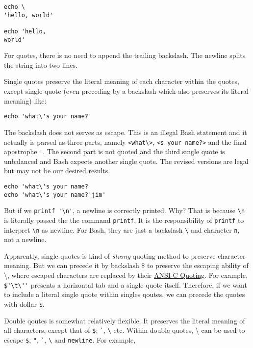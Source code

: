 \begin{lstlisting}
echo \
'hello, world'

echo 'hello,
world'
\end{lstlisting}

For quotes, there is no need to append the trailing backslash. The
newline splits the string into two lines.

Single quotes preserve the literal meaning of each character
within the quotes, except single quote (even preceding by a
backslash which also preserves its literal meaning) like:

\begin{lstlisting}
echo 'what\'s your name?'
\end{lstlisting}

The backslash does not serves as escape. This is an illegal Bash
statement and it actually is parsed as three parts, namely
\lstinline|<what\>|, \lstinline|<s your name?>| and the final
apostrophe \verb|'|. The second part is not quoted and the third
single quote is unbalanced and Bash expects another single
quote. The revised versions are legal but may not be our desired
results.

\begin{lstlisting}
echo 'what\'s your name?
echo 'what\'s your name?'jim'
\end{lstlisting}

But if we \lstinline|printf '\n'|, a newline is correctly
printed. Why? That is because \verb|\n| is literally passed the
the command \verb|printf|. It is the responsibility of
\verb|printf| to interpret \verb|\n| as newline. For Bash, they
are just a backslash \verb|\| and character \verb|n|, not a
newline.

Apparently, single quotes is kind of \textit{strong} quoting
method to preserve character meaning. But we can precede it by
backslash \$ to preserve the escaping ability of \textbackslash{},
where escaped characters are replaced by their
\href{https://www.gnu.org/software/bash/manual/bash.html#ANSI_002dC-Quoting}{ANSI-C
  Quoting}. For example,
\lstinline|$'\t\''| presents a horizontal tab and a single quote
itself. Therefore, if we want to include a literal single quote
within singles qoutes, we can precede the quotes with dollar
\lstinline|$|.

Double qoutes is somewhat relatively flexible. It preserves the
literal meaning of all characters, except that of
\lstinline|$|, \lstinline|`|, \lstinline|\| etc. Within double
quotes, \textbackslash{} can be used to escape \lstinline|$|,
\lstinline|"|, \lstinline|`|, \lstinline|\| and
\verb|newline|. For example,

